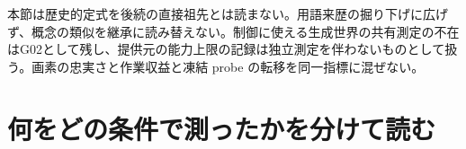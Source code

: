 \documentclass[lualatex,a4paper,10pt]{jlreq}
\begin{document}
\begin{claimboundary}[本節の読解上の境界]
\noindent 本節は歴史的定式を後続の直接祖先とは読まない。用語来歴の掘り下げに広げず、概念の類似を継承に読み替えない。制御に使える生成世界の共有測定の不在はG02として残し、提供元の能力上限の記録は独立測定を伴わないものとして扱う。画素の忠実さと作業収益と凍結 probe の転移を同一指標に混ぜない。\autocite{vmd101,vmd102,vmd103,vmd104,vmd105,vmd121,vmd106,vmd107}\par
\end{claimboundary}

\Needspace{0.20\textheight}
\section{何をどの条件で測ったかを分けて読む}
\label{sec:p15}
\end{document}
